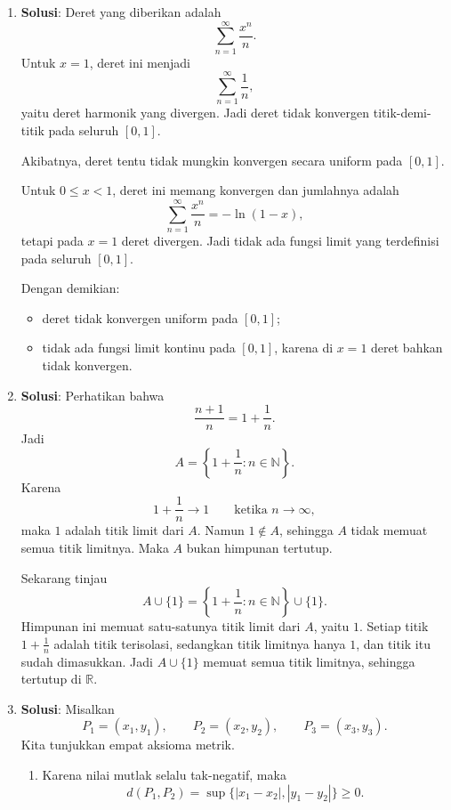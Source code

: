\documentclass[11pt,letterpaper]{article}
\newcommand{\R}{\mathbb{R}}
\newcommand{\N}{\mathbb{N}}
\newcommand{\jawab}{\textbf{Solusi}:}
\begin{document}
\begin{enumerate}
  \item \jawab
        Deret yang diberikan adalah
        \[
          \sum_{n=1}^{\infty} \frac{x^n}{n}.
        \]
        Untuk $x=1$, deret ini menjadi
        \[
          \sum_{n=1}^{\infty} \frac{1}{n},
        \]
        yaitu deret harmonik yang divergen. Jadi deret tidak konvergen titik-demi-titik pada seluruh $[0,1]$.

        Akibatnya, deret tentu tidak mungkin konvergen secara uniform pada $[0,1]$.

        Untuk $0\le x<1$, deret ini memang konvergen dan jumlahnya adalah
        \[
          \sum_{n=1}^{\infty} \frac{x^n}{n} = -\ln(1-x),
        \]
        tetapi pada $x=1$ deret divergen. Jadi tidak ada fungsi limit yang terdefinisi pada seluruh $[0,1]$.

        Dengan demikian:
        \begin{itemize}
          \item deret tidak konvergen uniform pada $[0,1]$;
          \item tidak ada fungsi limit kontinu pada $[0,1]$, karena di $x=1$ deret bahkan tidak konvergen.
        \end{itemize}

  \item \jawab
        Perhatikan bahwa
        \[
          \frac{n+1}{n} = 1+\frac{1}{n}.
        \]
        Jadi
        \[
          A = \left\{1+\frac{1}{n} : n\in\N\right\}.
        \]
        Karena
        \[
          1+\frac{1}{n} \to 1 \qquad \text{ketika } n\to\infty,
        \]
        maka $1$ adalah titik limit dari $A$.
        Namun $1 \notin A$, sehingga $A$ tidak memuat semua titik limitnya. Maka $A$ bukan himpunan tertutup.

        Sekarang tinjau
        \[
          A\cup\{1\} = \left\{1+\frac{1}{n} : n\in\N\right\}\cup\{1\}.
        \]
        Himpunan ini memuat satu-satunya titik limit dari $A$, yaitu $1$.
        Setiap titik $1+\frac{1}{n}$ adalah titik terisolasi, sedangkan titik limitnya hanya $1$, dan titik itu sudah dimasukkan.
        Jadi $A\cup\{1\}$ memuat semua titik limitnya, sehingga tertutup di $\R$.

  \item \jawab
        Misalkan
        \[
          P_1=(x_1,y_1), \qquad P_2=(x_2,y_2), \qquad P_3=(x_3,y_3).
        \]
        Kita tunjukkan empat aksioma metrik.

        \begin{enumerate}[label=\arabic*.]
          \item Karena nilai mutlak selalu tak-negatif, maka
                \[
                  d(P_1,P_2)=\sup\{|x_1-x_2|,|y_1-y_2|\}\ge 0.
                \]


\end{enumerate}
\end{enumerate}
\end{document}
